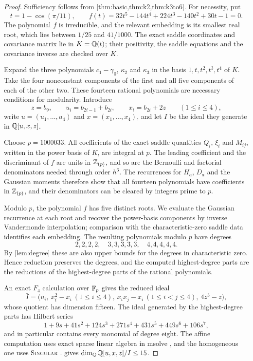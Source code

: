 \begin{proof}
Sufficiency follows from \cref{thm:basic,thm:k2,thm:k3to6}. For necessity, put
\[
t=1-\cos(\pi/11),\qquad f(t)=32t^5-144t^4+224t^3-140t^2+30t-1=0.
\]
The polynomial $f$ is irreducible, and the relevant embedding is its smallest real root, which lies between $1/25$ and $41/1000$. The exact saddle coordinates and covariance matrix lie in $K=\mathbb{Q}(t)$; their positivity, the saddle equations and the covariance inverse are checked over $K$.

Expand the three polynomials $c_1-\gamma_0$, $\kappa_2$ and $\kappa_3$ in the basis $1,t,t^2,t^3,t^4$ of $K$. Take the four nonconstant components of the first and all five components of each of the other two. These fourteen rational polynomials are necessary conditions for modularity. Introduce
\[
z=b_9,\qquad u_i=b_{2i-1}+b_{2i},\qquad x_i=b_{2i}+2z\qquad(1\le i\le4),
\]
write $u=(u_1,\dots,u_4)$ and $x=(x_1,\dots,x_4)$, and let $I$ be the ideal they generate in $\mathbb{Q}[u,x,z]$.

Choose $p=1000033$. All coefficients of the exact saddle quantities $Q_i$, $\xi_i$ and $M_{ij}$, written in the power basis of $K$, are integral at $p$. The leading coefficient and the discriminant of $f$ are units in $\mathbb{Z}_{(p)}$, and so are the Bernoulli and factorial denominators needed through order $h^6$. The recurrences for $H_a$, $D_a$ and the Gaussian moments therefore show that all fourteen polynomials have coefficients in $\mathbb{Z}_{(p)}$, and their denominators can be cleared by integers prime to $p$.

Modulo $p$, the polynomial $f$ has five distinct roots. We evaluate the Gaussian recurrence at each root and recover the power-basis components by inverse Vandermonde interpolation; comparison with the characteristic-zero saddle data identifies each embedding. The resulting polynomials modulo $p$ have degrees
\[
2,2,2,2,\quad3,3,3,3,3,\quad4,4,4,4,4.
\]
By \cref{lem:degree} these are also upper bounds for the degrees in characteristic zero. Hence reduction preserves the degrees, and the computed highest-degree parts are the reductions of the highest-degree parts of the rational polynomials.

An exact $F_4$ calculation over $\mathbb{F}_p$ gives the reduced ideal
\begin{equation}\label{eq:r9ideal}
\bar I=\bigl(u_i,\ x_i^2-x_i\ (1\le i\le4),\ x_ix_j-x_i\ (1\le i<j\le4),\ 4z^3-z\bigr),
\end{equation}
whose quotient has dimension fifteen. The ideal generated by the highest-degree parts has Hilbert series
\[
1+9s+41s^2+124s^3+271s^4+431s^5+449s^6+106s^7,
\]
and in particular contains every monomial of degree eight. The affine computation uses exact sparse linear algebra in \textsf{msolve} \cite{msolve}, and the homogeneous one uses \textsc{Singular} \cite{Singular}.  gives $\dim_{\mathbb{Q}}\mathbb{Q}[u,x,z]/I\le15$.


\end{proof}
